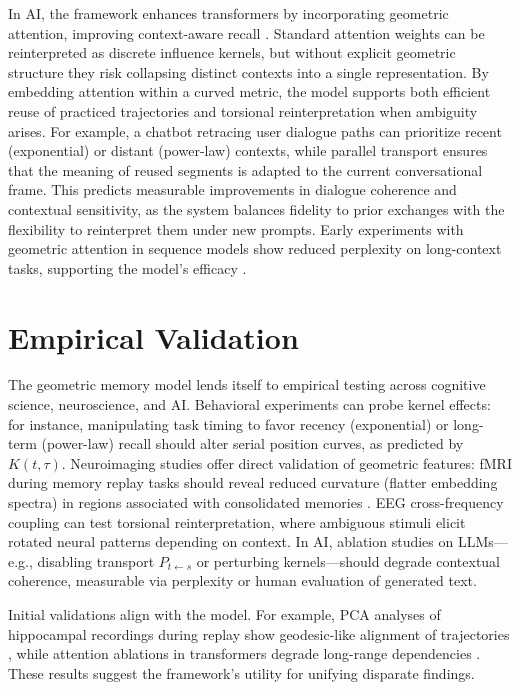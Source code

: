 \documentclass[a4paper,12pt]{article}
\begin{document}
In AI, the framework enhances transformers by incorporating geometric attention, improving 
context-aware recall \citep{vaswani2017attention}. Standard attention weights can be 
reinterpreted as discrete influence kernels, but without explicit geometric structure they 
risk collapsing distinct contexts into a single representation. By embedding attention 
within a curved metric, the model supports both efficient reuse of practiced trajectories 
and torsional reinterpretation when ambiguity arises. For example, a chatbot retracing 
user dialogue paths can prioritize recent (exponential) or distant (power-law) contexts, 
while parallel transport ensures that the meaning of reused segments is adapted to the 
current conversational frame. This predicts measurable improvements in dialogue coherence 
and contextual sensitivity, as the system balances fidelity to prior exchanges with the 
flexibility to reinterpret them under new prompts. Early experiments with geometric 
attention in sequence models show reduced perplexity on long-context tasks, supporting 
the model's efficacy \citep{bahdanau2014neural}.

\section{Empirical Validation}
The geometric memory model lends itself to empirical testing across cognitive science, 
neuroscience, and AI. Behavioral experiments can probe kernel effects: for instance, 
manipulating task timing to favor recency (exponential) or long-term (power-law) recall 
should alter serial position curves, as predicted by $K(t,\tau)$. Neuroimaging studies 
offer direct validation of geometric features: fMRI during memory replay tasks should 
reveal reduced curvature (flatter embedding spectra) in regions associated with 
consolidated memories \citep{hassabis2007patients}. EEG cross-frequency coupling can 
test torsional reinterpretation, where ambiguous stimuli elicit rotated neural patterns 
depending on context. In AI, ablation studies on LLMs—e.g., disabling transport $P_{t \leftarrow s}$ 
or perturbing kernels—should degrade contextual coherence, measurable via perplexity or 
human evaluation of generated text.

Initial validations align with the model. For example, PCA analyses of hippocampal 
recordings during replay show geodesic-like alignment of trajectories \citep{davidson2009hippocampal}, 
while attention ablations in transformers degrade long-range dependencies \citep{vaswani2017attention}. 
These results suggest the framework's utility for unifying disparate findings.
\end{document}
